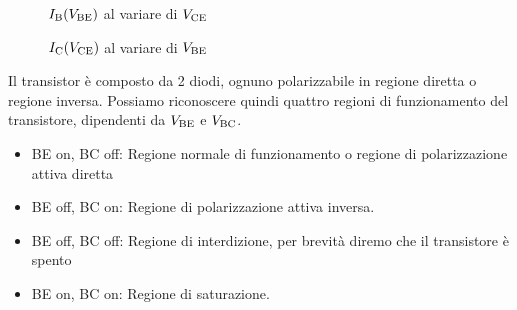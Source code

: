 \documentclass[../elettronica]{subfiles}
\begin{document}
\newpage
\begin{figure}[h]
\begin{minipage}{.47\textwidth}
    \centering
    \def\vt{1}
    \def\kuno{0.001}
    \def\kdue{20}
    \caption{$I_{\text{B}}(V_{\text{BE}})$ al variare di $V_{\text{CE}}$}
    \label{graph:transistor_bjt_3d}
\end{minipage}
\begin{minipage}{.47\textwidth}
    \centering
    \def\vt{1}
    \def\kuno{1.250}
    \def\kdue{3}
    \caption{$I_{\text{C}}(V_{\text{CE}})$ al variare di $V_{\text{BE}}$}
\end{minipage}
\end{figure}

\vspace{20pt}
\noindent Il transistor è composto da 2 diodi, ognuno polarizzabile in regione diretta o regione inversa. Possiamo riconoscere quindi
quattro regioni di funzionamento del transistore, dipendenti da $V_{\text{BE}}$ e $V_{\text{BC}}$.
\begin{itemize}
    \item BE on, BC off: Regione normale di funzionamento o regione di polarizzazione attiva diretta
    \item BE off, BC on: Regione di polarizzazione attiva inversa.
    \item BE off, BC off: Regione di interdizione, per brevità diremo che il transistore è spento
    \item BE on, BC on: Regione di saturazione.
\end{itemize}
\end{document}
